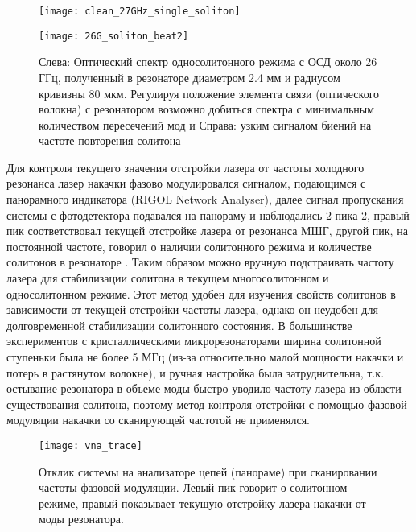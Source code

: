 \begin{figure}[ht]
  \begin{minipage}[ht]{0.49\linewidth}\centering
    \texttt{[image: clean\_27GHz\_single\_soliton]}
  \end{minipage}
  \hfill
  \begin{minipage}[ht]{0.49\linewidth}\centering
    \texttt{[image: 26G\_soliton\_beat2]}
  \end{minipage}
  \caption{Слева: Оптический спектр односолитонного режима с ОСД около 26 ГГц, полученный в резонаторе диаметром 2.4 мм и радиусом кривизны 80 мкм. Регулируя положение элемента связи (оптического волокна) с резонатором возможно добиться спектра с минимальным количеством пересечений мод и Справа: узким сигналом биений на частоте повторения солитона }
  \label{clean_27GHz_single_soliton}
\end{figure}

Для контроля текущего значения отстройки лазера от частоты холодного резонанса лазер накачки фазово модулировался сигналом, подающимся с панорамного индикатора (RIGOL Network Analyser), далее сигнал пропускания системы с фотодетектора подавался на панораму и наблюдались 2 пика \ref{vna_trace}, правый пик соответствовал текущей отстройке лазера от резонанса МШГ, другой пик, на постоянной частоте, говорил о наличии солитонного режима и количестве солитонов в резонаторе \cite{Karpov2017}. Таким образом можно вручную подстраивать частоту лазера для стабилизации солитона в текущем многосолитонном и односолитонном режиме. Этот метод удобен для изучения свойств солитонов в зависимости от текущей отстройки частоты лазера, однако он неудобен для долговременной стабилизации солитонного состояния. В большинстве экспериментов с кристаллическими микрорезонаторами ширина солитонной ступеньки была не более 5 МГц (из-за относительно малой мощности накачки и потерь в растянутом волокне), и ручная настройка была затруднительна, т.к. остывание резонатора в объеме моды быстро уводило частоту лазера из области существования солитона, поэтому метод контроля отстройки с помощью фазовой модуляции накачки со сканирующей частотой не применялся.

\begin{figure}[ht]
\centering
  \texttt{[image: vna\_trace]}
  \caption{Отклик системы на анализаторе цепей (панораме) при сканировании частоты фазовой модуляции. Левый пик говорит о солитонном режиме, правый показывает текущую отстройку лазера накачки от моды резонатора.}
  \label{vna_trace}
\end{figure}

